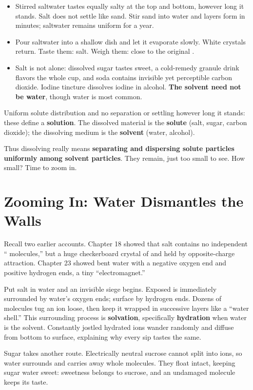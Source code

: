 \begin{itemize}[itemsep=2pt]
\item Stirred saltwater tastes equally salty at the top and bottom, however long it stands. Salt does not settle like sand. Stir sand into water and layers form in minutes; saltwater remains uniform for a year.
\item Pour saltwater into a shallow dish and let it evaporate slowly. White crystals return. Taste them: salt. Weigh them: close to the original .
\item Salt is not alone: dissolved sugar tastes sweet, a cold-remedy granule drink flavors the whole cup, and soda contains invisible yet perceptible carbon dioxide. Iodine tincture dissolves iodine in alcohol. \textbf{The solvent need not be water}, though water is most common.
\end{itemize}

Uniform solute distribution and no separation or settling however long it stands: these define a \textbf{solution}. The dissolved material is the \textbf{solute} (salt, sugar, carbon dioxide); the dissolving medium is the \textbf{solvent} (water, alcohol).

Thus dissolving really means \textbf{separating and dispersing solute particles uniformly among solvent particles}. They remain, just too small to see. How small? Time to zoom in.

\section{Zooming In: Water Dismantles the Walls}

Recall two earlier accounts. Chapter 18 showed that salt contains no independent `` molecules,'' but a huge checkerboard crystal of  and  held by opposite-charge attraction. Chapter 23 showed bent water with a negative oxygen end and positive hydrogen ends, a tiny ``electromagnet.''

Put salt in water and an invisible siege begins. Exposed  is immediately surrounded by water's oxygen ends; surface  by hydrogen ends. Dozens of molecules tug an ion loose, then keep it wrapped in successive layers like a ``water shell.'' This surrounding process is \textbf{solvation}, specifically \textbf{hydration} when water is the solvent. Constantly jostled hydrated ions wander randomly and diffuse from bottom to surface, explaining why every sip tastes the same.

Sugar takes another route. Electrically neutral sucrose cannot split into ions, so water surrounds and carries away whole molecules. They float intact, keeping sugar water sweet: sweetness belongs to sucrose, and an undamaged molecule keeps its taste.

